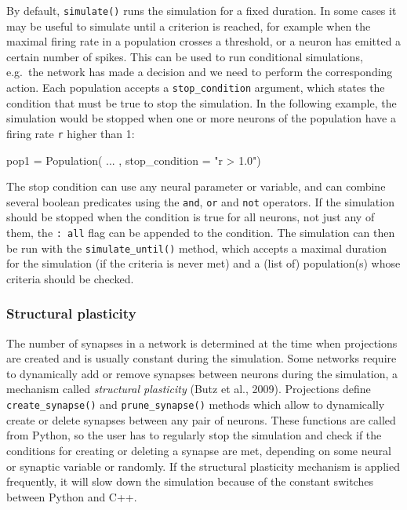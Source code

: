 \documentclass[
  11pt,
  a4paper,
]{scrbook}
\newenvironment{Shaded}{}{}
\newcommand{\NormalTok}[1]{\textcolor[rgb]{0.14,0.16,0.18}{#1}}
\newcommand{\OperatorTok}[1]{\textcolor[rgb]{0.14,0.16,0.18}{#1}}
\newcommand{\StringTok}[1]{\textcolor[rgb]{0.01,0.18,0.38}{#1}}
\begin{document}
By default, \texttt{simulate()} runs the simulation for a fixed
duration. In some cases it may be useful to simulate until a criterion
is reached, for example when the maximal firing rate in a population
crosses a threshold, or a neuron has emitted a certain number of spikes.
This can be used to run conditional simulations, e.g.~the network has
made a decision and we need to perform the corresponding action. Each
population accepts a \texttt{stop\_condition} argument, which states the
condition that must be true to stop the simulation. In the following
example, the simulation would be stopped when one or more neurons of the
population have a firing rate \texttt{r} higher than 1:

\begin{Shaded}
\begin{Highlighting}[]
\NormalTok{pop1 }\OperatorTok{=}\NormalTok{ Population( ... , stop\_condition }\OperatorTok{=} \StringTok{"r \textgreater{} 1.0"}\NormalTok{)}
\end{Highlighting}
\end{Shaded}

The stop condition can use any neural parameter or variable, and can
combine several boolean predicates using the \texttt{and}, \texttt{or}
and \texttt{not} operators. If the simulation should be stopped when the
condition is true for all neurons, not just any of them, the
\texttt{:\ all} flag can be appended to the condition. The simulation
can then be run with the \texttt{simulate\_until()} method, which
accepts a maximal duration for the simulation (if the criteria is never
met) and a (list of) population(s) whose criteria should be checked.

\subsubsection*{Structural plasticity}\label{structural-plasticity}

The number of synapses in a network is determined at the time when
projections are created and is usually constant during the simulation.
Some networks require to dynamically add or remove synapses between
neurons during the simulation, a mechanism called \emph{structural
plasticity} (Butz et al., 2009). Projections define
\texttt{create\_synapse()} and \texttt{prune\_synapse()} methods which
allow to dynamically create or delete synapses between any pair of
neurons. These functions are called from Python, so the user has to
regularly stop the simulation and check if the conditions for creating
or deleting a synapse are met, depending on some neural or synaptic
variable or randomly. If the structural plasticity mechanism is applied
frequently, it will slow down the simulation because of the constant
switches between Python and C++.
\end{document}
